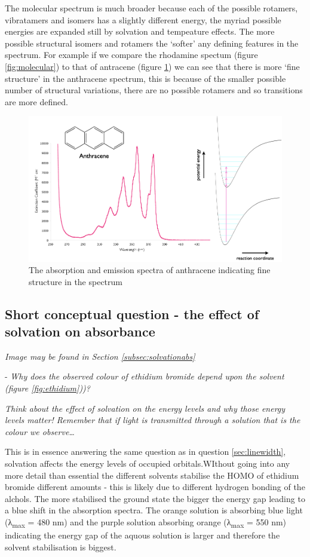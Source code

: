 \documentclass[
]{book}
\begin{document}
The molecular spectrum is much broader because each of the possible rotamers, vibratamers and isomers has a slightly different energy, the myriad possible energies are expanded still by solvation and tempeature effects. The more possible structural isomers and rotamers the `softer' any defining features in the spectrum. For example if we compare the rhodamine spectum (figure \ref{fig:molecular}) to that of antracene (figure \ref{fig:anthracene}) we can see that there is more `fine structure' in the anthracene spectrum, this is because of the smaller possible number of structural variations, there are no possible rotamers and so transitions are more defined.

\begin{figure}

{\centering \includegraphics[width=0.7\linewidth]{images/anthracene} 

}

\caption{The absorption and emission spectra of anthracene indicating fine structure in the spectrum}\label{fig:anthracene}
\end{figure}

\hypertarget{subsec:solvationabsans}{%
\subsection{Short conceptual question - the effect of solvation on absorbance}\label{subsec:solvationabsans}}

\emph{Image may be found in Section \ref{subsec:solvationabs}}

- \emph{Why does the observed colour of ethidium bromide depend upon the solvent (figure \ref{fig:ethidium}))?}

\emph{Think about the effect of solvation on the energy levels and why those energy levels matter! Remember that if light is transmitted through a solution that is the colour we observe\ldots{}}

This is in essence answering the same question as in question \ref{sec:linewidth}, solvation affects the energy levels of occupied orbitals.WIthout going into any more detail than essential the different solvents stabilise the HOMO of ethidium bromide different amounts - this is likely due to different hydrogen bonding of the alchols. The more stabilised the ground state the bigger the energy gap leading to a blue shift in the absorption spectra. The orange solution is absorbing blue light (λ\textsubscript{max} = 480 nm) and the purple solution absorbing orange (λ\textsubscript{max} = 550 nm) indicating the energy gap of the aquous solution is larger and therefore the solvent stabilisation is biggest.
\end{document}
